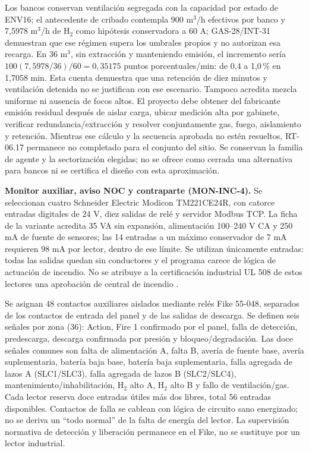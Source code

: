 Los bancos conservan ventilación segregada con la capacidad por estado de ENV16; el antecedente de cribado contempla 900 m$^3$/h efectivos por banco y 7,5978 m$^3$/h de H$_2$ como hipótesis conservadora a 60 A; GAS-28/INT-31 demuestran que ese régimen supera los umbrales propios y no autorizan esa recarga. En 36 m$^3$, sin extracción y manteniendo emisión, el incremento sería $100(7,5978/36)/60=0,35175$ puntos porcentuales/min: de 0,4 a 1,0\,\% en 1,7058 min. Esta cuenta demuestra que una retención de diez minutos y ventilación detenida no se justifican con ese escenario. Tampoco acredita mezcla uniforme ni ausencia de focos altos. El proyecto debe obtener del fabricante emisión residual después de aislar carga, ubicar medición alta por gabinete, verificar redundancia/extracción y resolver conjuntamente gas, fuego, aislamiento y retención. Mientras ese cálculo y la secuencia aprobada no estén resueltos, RT-06.17 permanece no completado para el conjunto del sitio. Se conservan la familia de agente y la sectorización elegidas; no se ofrece como cerrada una alternativa para bancos ni se certifica el diseño con esta aproximación.

\textbf{Monitor auxiliar, aviso NOC y contraparte (MON-INC-4).}\label{sec:sd4-moninc4}
Se seleccionan cuatro Schneider Electric Modicon TM221CE24R, con catorce entradas digitales de 24 V, diez salidas de relé y servidor Modbus TCP. La ficha de la variante acredita 35 VA sin expansión, alimentación 100--240 V CA y 250 mA de fuente de sensores; las 14 entradas a un máximo conservador de 7 mA requieren 98 mA por lector, dentro de ese límite. Se utilizan únicamente entradas: todas las salidas quedan sin conductores y el programa carece de lógica de actuación de incendio. No se atribuye a la certificación industrial UL 508 de estos lectores una aprobación de central de incendio \parencite[pp.~1--4]{l18-m221}.

Se asignan 48 contactos auxiliares aislados mediante relés Fike 55-048, separados de los contactos de entrada del panel y de las salidas de descarga. Se definen seis señales por zona (36): Action, Fire 1 confirmado por el panel, falla de detección, predescarga, descarga confirmada por presión y bloqueo/degradación. Las doce señales comunes son falta de alimentación A, falta B, avería de fuente base, avería suplementaria, batería baja base, batería baja suplementaria, falla agregada de lazos A (SLC1/SLC3), falla agregada de lazos B (SLC2/SLC4), mantenimiento/inhabilitación, H$_2$ alto A, H$_2$ alto B y fallo de ventilación/gas. Cada lector reserva doce entradas útiles más dos libres, total 56 entradas disponibles. Contactos de falla se cablean con lógica de circuito sano energizado; no se deriva un ``todo normal'' de la falta de energía del lector. La supervisión normativa de detección y liberación permanece en el Fike, no se sustituye por un lector industrial.

